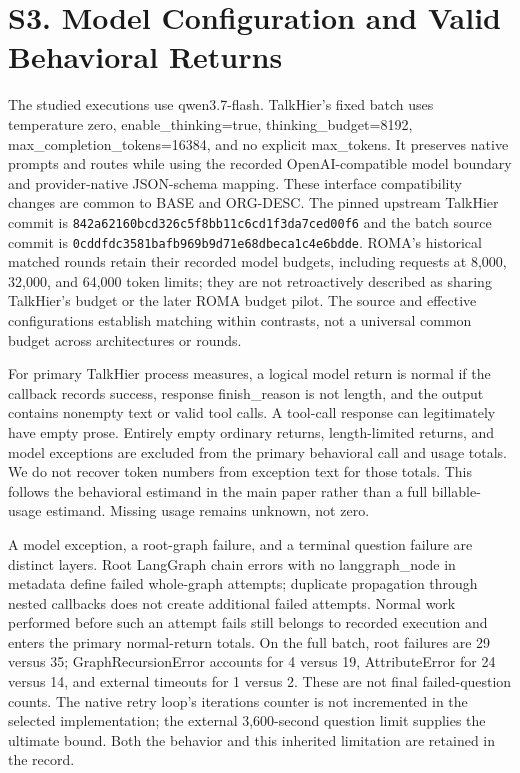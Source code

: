 \documentclass[10pt,letterpaper,twocolumn]{article}
\begin{document}
\section*{S3. Model Configuration and Valid Behavioral Returns}

The studied executions use qwen3.7-flash. TalkHier's fixed batch uses temperature zero, enable\_thinking=true, thinking\_budget=8192, max\_completion\_tokens=16384, and no explicit max\_tokens. It preserves native prompts and routes while using the recorded OpenAI-compatible model boundary and provider-native JSON-schema mapping. These interface compatibility changes are common to BASE and ORG-DESC. The pinned upstream TalkHier commit is \nolinkurl{842a62160bcd326c5f8bb11c6cd1f3da7ced00f6} and the batch source commit is \nolinkurl{0cddfdc3581bafb969b9d71e68dbeca1c4e6bdde}. ROMA's historical matched rounds retain their recorded model budgets, including requests at 8,000, 32,000, and 64,000 token limits; they are not retroactively described as sharing TalkHier's budget or the later ROMA budget pilot. The source and effective configurations establish matching within contrasts, not a universal common budget across architectures or rounds.


For primary TalkHier process measures, a logical model return is normal if the callback records success, response finish\_reason is not length, and the output contains nonempty text or valid tool calls. A tool-call response can legitimately have empty prose. Entirely empty ordinary returns, length-limited returns, and model exceptions are excluded from the primary behavioral call and usage totals. We do not recover token numbers from exception text for those totals. This follows the behavioral estimand in the main paper rather than a full billable-usage estimand. Missing usage remains unknown, not zero.


A model exception, a root-graph failure, and a terminal question failure are distinct layers. Root LangGraph chain errors with no langgraph\_node in metadata define failed whole-graph attempts; duplicate propagation through nested callbacks does not create additional failed attempts. Normal work performed before such an attempt fails still belongs to recorded execution and enters the primary normal-return totals. On the full batch, root failures are 29 versus 35; GraphRecursionError accounts for 4 versus 19, AttributeError for 24 versus 14, and external timeouts for 1 versus 2. These are not final failed-question counts. The native retry loop's iterations counter is not incremented in the selected implementation; the external 3,600-second question limit supplies the ultimate bound. Both the behavior and this inherited limitation are retained in the record.
\end{document}
